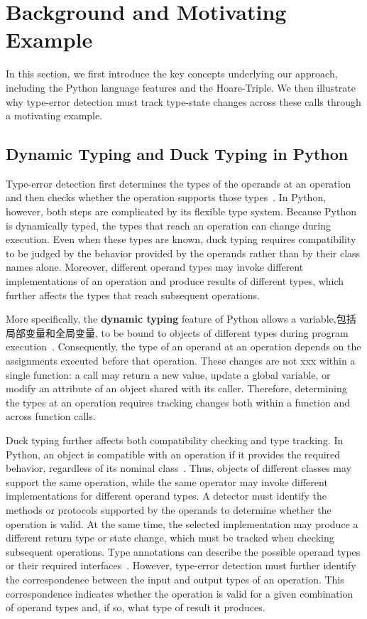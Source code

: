 \section{Background and Motivating Example}
\label{sec:background}

In this section, we first introduce the key concepts underlying our approach,
including the Python language features and the Hoare-Triple.
We then illustrate why type-error detection must track type-state changes
across these calls through a motivating example.

\subsection{Dynamic Typing and Duck Typing in Python}

Type-error detection first determines the types of the operands at an
operation and then checks whether the operation supports those
types~\cite{oh2024pyinder}. In Python, however, both steps are complicated by
its flexible type system. Because Python is dynamically typed, the types
that reach an operation can change during execution. Even when these types
are known, duck typing requires compatibility to be judged by the behavior
provided by the operands rather than by their class names alone. Moreover,
different operand types may invoke different implementations of an
operation and produce results of different types, which further affects the
types that reach subsequent operations.

More specifically, the \textbf{dynamic typing} feature of Python allows a variable,包括局部变量和全局变量,
to be bound to objects of different types during program execution~\cite{pythonExecutionModel,pythonDataModel}.
Consequently, the type of an operand at an operation depends on the
assignments executed before that operation. These changes are not xxx within a single function: a call may return a new value, update a global
variable, or modify an attribute of an object shared with its caller.
Therefore, determining the types at an operation requires tracking changes
both within a function and across function calls.

Duck typing further affects both compatibility checking and type tracking.
In Python, an object is compatible with an operation if it provides the
required behavior, regardless of its nominal class~\cite{pythonGlossary}.
Thus, objects of different classes may support the same operation, while the
same operator may invoke different implementations for different operand
types. A detector must identify the methods or protocols supported by the
operands to determine whether the operation is valid. At the same time, the
selected implementation may produce a different return type or state
change, which must be tracked when checking subsequent operations. Type
annotations can describe the possible operand types or their required
interfaces~\cite{pep484}. However, type-error detection must further identify
the correspondence between the input and output types of an operation. This
correspondence indicates whether the operation is valid for a given
combination of operand types and, if so, what type of result it produces.


